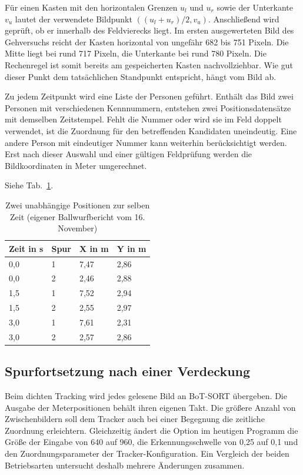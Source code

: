 Für einen Kasten mit den horizontalen Grenzen $u_l$ und $u_r$ sowie der Unterkante $v_u$ lautet der verwendete Bildpunkt $((u_l+u_r)/2,v_u)$. Anschließend wird geprüft, ob er innerhalb des Feldvierecks liegt. Im ersten ausgewerteten Bild des Gehversuchs reicht der Kasten horizontal von ungefähr 682 bis 751 Pixeln. Die Mitte liegt bei rund 717 Pixeln, die Unterkante bei rund 780 Pixeln. Die Rechenregel ist somit bereits am gespeicherten Kasten nachvollziehbar. Wie gut dieser Punkt dem tatsächlichen Standpunkt entspricht, hängt vom Bild ab.

Zu jedem Zeitpunkt wird eine Liste der Personen geführt. Enthält das Bild zwei Personen mit verschiedenen Kennnummern, entstehen zwei Positionsdatensätze mit demselben Zeitstempel. Fehlt die Nummer oder wird sie im Feld doppelt verwendet, ist die Zuordnung für den betreffenden Kandidaten uneindeutig. Eine andere Person mit eindeutiger Nummer kann weiterhin berücksichtigt werden. Erst nach dieser Auswahl und einer gültigen Feldprüfung werden die Bildkoordinaten in Meter umgerechnet.

Siehe Tab.~\ref{tab:em-ballreihe}.
\begin{table}[htbp]\centering\caption{Zwei unabhängige Positionen zur selben Zeit (eigener Ballwurfbericht vom 16. November)}\label{tab:em-ballreihe}
\begin{tabular}{@{}llll@{}}\toprule Zeit in s & Spur & X in m & Y in m\\\midrule
0,0 & 1 & 7,47 & 2,86\\
0,0 & 2 & 2,46 & 2,88\\
1,5 & 1 & 7,52 & 2,94\\
1,5 & 2 & 2,55 & 2,97\\
3,0 & 1 & 7,61 & 2,31\\
3,0 & 2 & 2,57 & 2,86\\\bottomrule\end{tabular}\end{table}

\subsection{Spurfortsetzung nach einer Verdeckung}
Beim dichten Tracking wird jedes gelesene Bild an BoT-SORT übergeben. Die Ausgabe der Meterpositionen behält ihren eigenen Takt. Die größere Anzahl von Zwischenbildern soll dem Tracker auch bei einer Begegnung die zeitliche Zuordnung erleichtern. Gleichzeitig ändert die Option im heutigen Programm die Größe der Eingabe von 640 auf 960, die Erkennungsschwelle von 0,25 auf 0,1 und den Zuordnungsparameter der Tracker-Konfiguration. Ein Vergleich der beiden Betriebsarten untersucht deshalb mehrere Änderungen zusammen.

